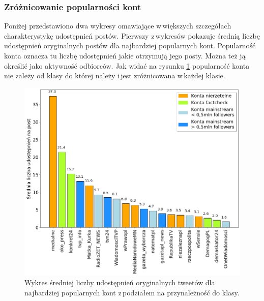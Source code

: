 \subsubsection{Zróżnicowanie popularności kont}
Poniżej przedstawiono dwa wykresy omawiające w\,większych szczegółach charakterystykę udostępnień postów. Pierwszy z\,wykresów pokazuje średnią liczbę udostępnień oryginalnych postów dla najbardziej popularnych kont. Popularność konta oznacza tu liczbę udostępnień jakie otrzymują jego posty. Można też ją określić jako aktywność odbiorców. Jak widać na rysunku \ref{fig:retweets-per-tweet} popularność konta nie zależy od klasy do której należy i\,jest zróżnicowana w\,każdej klasie.
\begin{figure}[!h]
	\centering \includegraphics[width=0.95\linewidth]{img/results/retweetspertweet3.png}
	\caption{Wykres średniej liczby udostępnień oryginalnych tweetów dla najbardziej popularnych kont z\,podziałem na przynależność do klasy.} \label{fig:retweets-per-tweet}
\end{figure}

